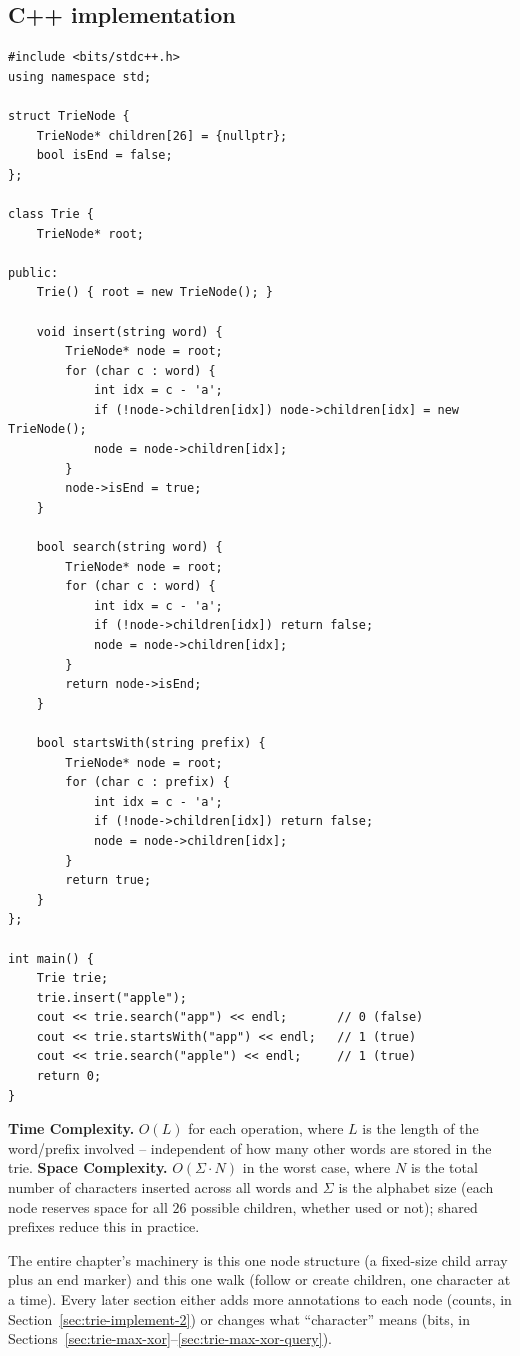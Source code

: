 \subsection*{C++ implementation}

\begin{lstlisting}
#include <bits/stdc++.h>
using namespace std;

struct TrieNode {
    TrieNode* children[26] = {nullptr};
    bool isEnd = false;
};

class Trie {
    TrieNode* root;

public:
    Trie() { root = new TrieNode(); }

    void insert(string word) {
        TrieNode* node = root;
        for (char c : word) {
            int idx = c - 'a';
            if (!node->children[idx]) node->children[idx] = new TrieNode();
            node = node->children[idx];
        }
        node->isEnd = true;
    }

    bool search(string word) {
        TrieNode* node = root;
        for (char c : word) {
            int idx = c - 'a';
            if (!node->children[idx]) return false;
            node = node->children[idx];
        }
        return node->isEnd;
    }

    bool startsWith(string prefix) {
        TrieNode* node = root;
        for (char c : prefix) {
            int idx = c - 'a';
            if (!node->children[idx]) return false;
            node = node->children[idx];
        }
        return true;
    }
};

int main() {
    Trie trie;
    trie.insert("apple");
    cout << trie.search("app") << endl;       // 0 (false)
    cout << trie.startsWith("app") << endl;   // 1 (true)
    cout << trie.search("apple") << endl;     // 1 (true)
    return 0;
}
\end{lstlisting}

\begin{complexitybox}
\textbf{Time Complexity.} $O(L)$ for each operation, where $L$ is the
length of the word/prefix involved -- independent of how many other
words are stored in the trie.
\textbf{Space Complexity.} $O(\Sigma \cdot N)$ in the worst case, where
$N$ is the total number of characters inserted across all words and
$\Sigma$ is the alphabet size (each node reserves space for all $26$
possible children, whether used or not); shared prefixes reduce this in
practice.
\end{complexitybox}

\begin{takeawaybox}
The entire chapter's machinery is this one node structure (a fixed-size
child array plus an end marker) and this one walk (follow or create
children, one character at a time). Every later section either adds more
annotations to each node (counts, in
Section~\ref{sec:trie-implement-2}) or changes what ``character'' means
(bits, in Sections~\ref{sec:trie-max-xor}--\ref{sec:trie-max-xor-query}).
\end{takeawaybox}
